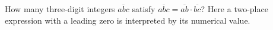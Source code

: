How many three-digit integers $\overline{abc}$ satisfy $\overline{abc}=\overline{ab}\cdot\overline{bc}$? Here a two-place expression with a leading zero is interpreted by its numerical value.
